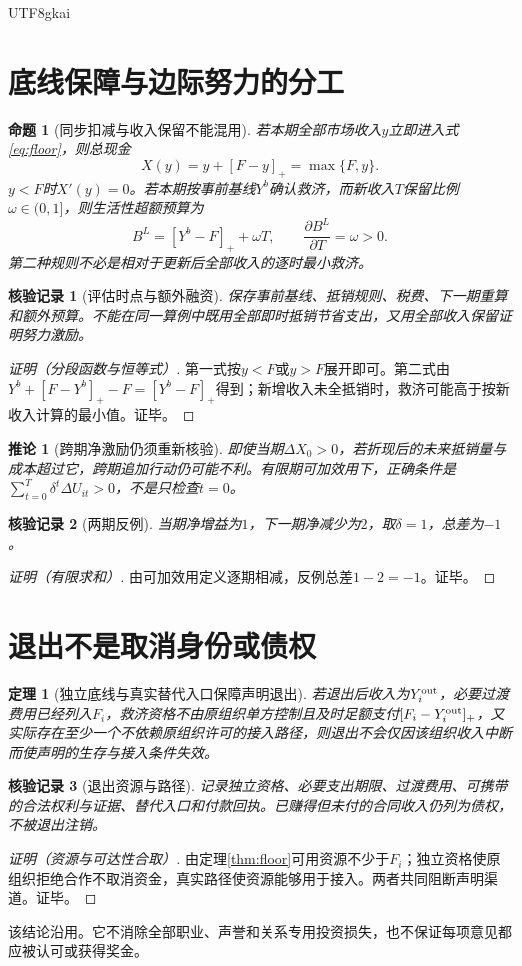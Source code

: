 \documentclass[12pt,a4paper,openany]{report}
\newtheorem{theorem}{定理}[chapter]
\newtheorem{proposition}{命题}[chapter]
\newtheorem{corollary}{推论}[chapter]
\newtheorem{Certificate}{核验记录}[chapter]
\begin{document}
\begin{CJK*}{UTF8}{gkai}
\section{底线保障与边际努力的分工}
\begin{proposition}[同步扣减与收入保留不能混用]
\label{prop:clawback}
若本期全部市场收入$y$立即进入式\eqref{eq:floor}，则总现金
\[
 X(y)=y+[F-y]_+=\max\{F,y\}.
\]
$y<F$时$X'(y)=0$。若本期按事前基线$Y^b$确认救济，而新收入$T$保留比例$\omega\in(0,1]$，则生活性超额预算为
\[
 B^L=[Y^b-F]_++\omega T,\qquad \frac{\partial B^L}{\partial T}=\omega>0.
\]
第二种规则不必是相对于更新后全部收入的逐时最小救济。
\end{proposition}
\begin{Certificate}[评估时点与额外融资]
保存事前基线、抵销规则、税费、下一期重算和额外预算。不能在同一算例中既用全部即时抵销节省支出，又用全部收入保留证明努力激励。
\end{Certificate}
\begin{proof}[证明（分段函数与恒等式）]
第一式按$y<F$或$y>F$展开即可。第二式由$Y^b+[F-Y^b]_+-F=[Y^b-F]_+$得到；新增收入未全抵销时，救济可能高于按新收入计算的最小值。证毕。
\end{proof}
\begin{corollary}[跨期净激励仍须重新核验]
\label{cor:dynamic-incentive}
即使当期$\Delta X_0>0$，若折现后的未来抵销量与成本超过它，跨期追加行动仍可能不利。有限期可加效用下，正确条件是$\sum_{t=0}^{T}\delta^t\Delta U_{it}>0$，不是只检查$t=0$。
\end{corollary}
\begin{Certificate}[两期反例]
当期净增益为$1$，下一期净减少为$2$，取$\delta=1$，总差为$-1$。
\end{Certificate}
\begin{proof}[证明（有限求和）]
由可加效用定义逐期相减，反例总差$1-2=-1$。证毕。
\end{proof}

\section{退出不是取消身份或债权}
\begin{theorem}[独立底线与真实替代入口保障声明退出]
\label{thm:exit}
若退出后收入为$Y_i^{\rm out}$，必要过渡费用已经列入$F_i$，救济资格不由原组织单方控制且及时足额支付$[F_i-Y_i^{\rm out}]_+$，又实际存在至少一个不依赖原组织许可的接入路径，则退出不会仅因该组织收入中断而使声明的生存与接入条件失效。
\end{theorem}
\begin{Certificate}[退出资源与路径]
记录独立资格、必要支出期限、过渡费用、可携带的合法权利与证据、替代入口和付款回执。已赚得但未付的合同收入仍列为债权，不被退出注销。
\end{Certificate}
\begin{proof}[证明（资源与可达性合取）]
由定理\ref{thm:floor}可用资源不少于$F_i$；独立资格使原组织拒绝合作不取消资金，真实路径使资源能够用于接入。两者共同阻断声明渠道。证毕。
\end{proof}
该结论沿用\cite[“独立底线保障阻断特定生存排斥渠道”]{SourceSupplement}。它不消除全部职业、声誉和关系专用投资损失，也不保证每项意见都应被认可或获得奖金。


\end{CJK*}
\end{document}
